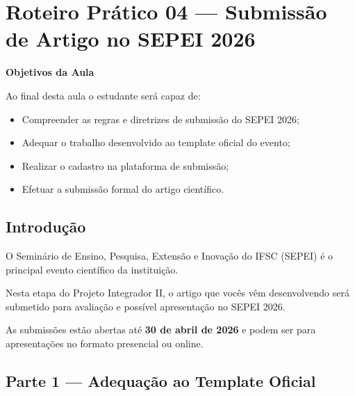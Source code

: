
\section{Roteiro Prático 04 — Submissão de Artigo no SEPEI 2026}


\begin{boxObjetivos}
\textbf{Objetivos da Aula}

Ao final desta aula o estudante será capaz de:

\begin{itemize}
\item Compreender as regras e diretrizes de submissão do SEPEI 2026;
\item Adequar o trabalho desenvolvido ao template oficial do evento;
\item Realizar o cadastro na plataforma de submissão;
\item Efetuar a submissão formal do artigo científico.
\end{itemize}
\end{boxObjetivos}


\subsection{Introdução}

O Seminário de Ensino, Pesquisa, Extensão e Inovação do IFSC (SEPEI) é o principal evento científico da instituição. 

Nesta etapa do Projeto Integrador II, o artigo que vocês vêm desenvolvendo será submetido para avaliação e possível apresentação no SEPEI 2026.

As submissões estão abertas até \textbf{30 de abril de 2026} e podem ser para apresentações no formato presencial ou online.


\subsection{Parte 1 — Adequação ao Template Oficial}

